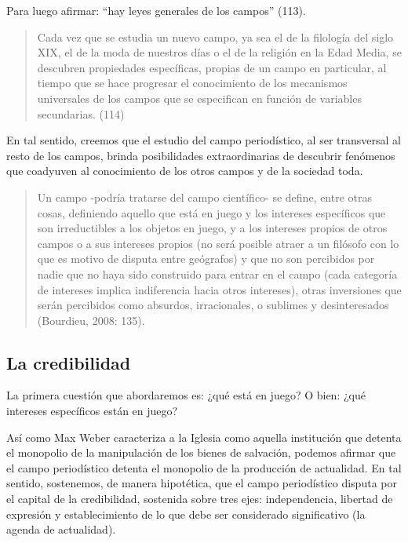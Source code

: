 Para luego afirmar: ``hay leyes generales de los campos'' (113).

\begin{quote}
Cada vez que se estudia un nuevo campo, ya sea el de la filología del siglo XIX, el de la moda de nuestros días o el de la religión en la Edad Media, se descubren propiedades específicas, propias de un campo en particular, al tiempo que se hace progresar el conocimiento de los mecanismos universales de los campos que se especifican en función de variables secundarias. (114)
\end{quote}

En tal sentido, creemos que el estudio del campo periodístico, al ser transversal al resto de los campos, brinda posibilidades extraordinarias de descubrir fenómenos que coadyuven al conocimiento de los otros campos y de la sociedad toda.

\begin{quote}
Un campo -podría tratarse del campo científico- se define, entre otras cosas, definiendo aquello que está en juego y los intereses específicos que son irreductibles a los objetos en juego, y a los intereses propios de otros campos o a sus intereses propios (no será posible atraer a un filósofo con lo que es motivo de disputa entre geógrafos) y que no son percibidos por nadie que no haya sido construido para entrar en el campo (cada categoría de intereses implica indiferencia hacia otros intereses), otras inversiones que serán percibidos como absurdos, irracionales, o sublimes y desinteresados (Bourdieu, 2008: 135).
\end{quote}

\subsection{La credibilidad}

La primera cuestión que abordaremos es: ¿qué está en juego? O bien: ¿qué intereses específicos están en juego?

Así como Max Weber caracteriza a la Iglesia como aquella institución que detenta el monopolio de la manipulación de los bienes de salvación, podemos afirmar que el campo periodístico detenta el monopolio de la producción de actualidad. En tal sentido, sostenemos, de manera hipotética, que el campo periodístico disputa por el capital de la credibilidad, sostenida sobre tres ejes: independencia, libertad de expresión y establecimiento de lo que debe ser considerado significativo (la agenda de actualidad).

